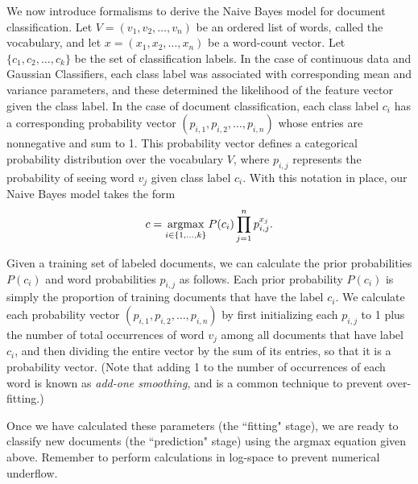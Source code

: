 We now introduce formalisms to derive the Naive Bayes model for document classification.
Let $V = (v_1,v_2,\ldots,v_n)$ be an ordered list of words, called the vocabulary, and let
$x = (x_1,x_2,\ldots,x_n)$ be a word-count vector.
Let $\{c_1,c_2,\ldots,c_k\}$ be the set of classification labels.
In the case of continuous data and Gaussian Classifiers, each class label was associated with corresponding
mean and variance parameters, and these determined the likelihood of the feature vector given the class label.
In the case of document classification, each class label $c_i$ has a corresponding probability vector
$(p_{i,1}, p_{i,2}, \ldots, p_{i,n})$ whose entries are nonnegative and sum to 1.
This probability vector defines a categorical probability distribution over the vocabulary $V$, where $p_{i,j}$
represents the probability of seeing word $v_j$ given class label $c_i$.
With this notation in place, our Naive Bayes model takes the form
\[
c = \underset{i \in \{1, \ldots, k\}}{\mbox{argmax}}\, P(c_i)\prod_{j=1}^n p_{i,j}^{x_j}.
\]

Given a training set of labeled documents, we can calculate the prior probabilities $P(c_i)$ and word probabilities
$p_{i,j}$ as follows.
Each prior probability $P(c_i)$ is simply the proportion of training documents that have the label $c_i$.
We calculate each probability vector $(p_{i,1}, p_{i,2}, \ldots, p_{i,n})$ by first initializing
each $p_{i,j}$ to 1 plus the number of total occurrences of word $v_j$ among all documents that have label $c_i$,
and then dividing the entire vector by the sum of its entries, so that it is a probability vector.
(Note that adding 1 to the number of occurrences of each word is known as \emph{add-one smoothing}, and is a
common technique to prevent over-fitting.)

Once we have calculated these parameters (the ``fitting" stage), we are ready to classify new documents
(the ``prediction" stage) using the argmax equation given above.
Remember to perform calculations in log-space to prevent numerical underflow.

